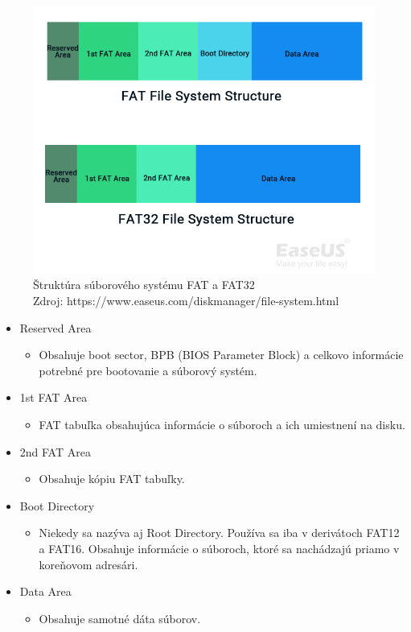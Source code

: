 \documentclass[12pt,oneside,slovak,a4paper]{article}
\begin{document}
\begin{figure}[H]
	\centering
	\captionsetup{justification=centering,margin=2cm}
	\includegraphics[width=\linewidth]{./images/fat-file-system-structure.png}
	\centering
	\caption{Štruktúra súborového systému FAT a FAT32 \\ Zdroj: https://www.easeus.com/diskmanager/file-system.html}
\end{figure}

\begin{itemize}
	\item Reserved Area
		\begin{itemize}
			\item Obsahuje boot sector, BPB (BIOS Parameter Block) a celkovo informácie potrebné pre bootovanie a súborový systém.
		\end{itemize}
	\item 1st FAT Area
		\begin{itemize}
			\item FAT tabuľka obsahujúca informácie o súboroch a ich umiestnení na disku.
		\end{itemize}
	\item 2nd FAT Area
		\begin{itemize}
			\item Obsahuje kópiu FAT tabuľky.
		\end{itemize}
	\item Boot Directory
		\begin{itemize}
			\item Niekedy sa nazýva aj Root Directory. Používa sa iba v derivátoch FAT12 a FAT16. Obsahuje informácie o súboroch, ktoré sa nachádzajú priamo v koreňovom adresári.
		\end{itemize}
	\item Data Area
		\begin{itemize}
			\item Obsahuje samotné dáta súborov.
		\end{itemize}
\end{itemize}
\end{document}
